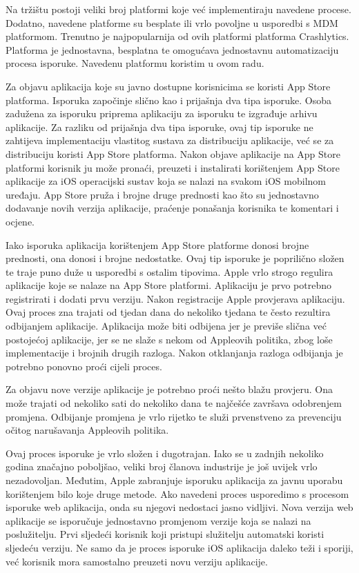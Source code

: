 \documentclass[times, utf8, diplomski, numeric]{fer}
\begin{document}
Na tržištu postoji veliki broj platformi koje već implementiraju navedene procese. Dodatno, navedene platforme su besplate ili vrlo povoljne u usporedbi s MDM platformom. Trenutno je najpopularnija od ovih platformi platforma Crashlytics. Platforma je jednostavna, besplatna te omogućava jednostavnu automatizaciju procesa isporuke. Navedenu platformu koristim u ovom radu.

Za objavu aplikacija koje su javno dostupne korisnicima se koristi App Store platforma. Isporuka započinje slično kao i prijašnja dva tipa isporuke. Osoba zadužena za isporuku priprema aplikaciju za isporuku te izgrađuje arhivu aplikacije. Za razliku od prijašnja dva tipa isporuke, ovaj tip isporuke ne zahtijeva implementaciju vlastitog sustava za distribuciju aplikacije, već se za distribuciju koristi App Store platforma. Nakon objave aplikacije na App Store platformi korisnik ju može pronaći, preuzeti i instalirati korištenjem App Store aplikacije za iOS operacijski sustav koja se nalazi na svakom iOS mobilnom uređaju. App Store pruža i brojne druge prednosti kao što su jednostavno dodavanje novih verzija aplikacije, praćenje ponašanja korisnika te komentari i ocjene.

Iako isporuka aplikacija korištenjem App Store platforme donosi brojne prednosti, ona donosi i brojne nedostatke. Ovaj tip isporuke je poprilično složen te traje puno duže u usporedbi s ostalim tipovima. Apple vrlo strogo regulira aplikacije koje se nalaze na App Store platformi. Aplikaciju je prvo potrebno registrirati i dodati prvu verziju. Nakon registracije Apple provjerava aplikaciju. Ovaj proces zna trajati od tjedan dana do nekoliko tjedana te često rezultira odbijanjem aplikacije. Aplikacija može biti odbijena jer je previše slična već postojećoj aplikacije, jer se ne slaže s nekom od Appleovih politika, zbog loše implementacije i brojnih drugih razloga. Nakon otklanjanja razloga odbijanja je potrebno ponovno proći cijeli proces.

Za objavu nove verzije aplikacije je potrebno proći nešto blažu provjeru. Ona može trajati od nekoliko sati do nekoliko dana te najčešće završava odobrenjem promjena. Odbijanje promjena je vrlo rijetko te služi prvenstveno za prevenciju očitog narušavanja Appleovih politika.

Ovaj proces isporuke je vrlo složen i dugotrajan. Iako se u zadnjih nekoliko godina značajno poboljšao, veliki broj članova industrije je još uvijek vrlo nezadovoljan. Međutim, Apple zabranjuje isporuku aplikacija za javnu uporabu korištenjem bilo koje druge metode. Ako navedeni proces usporedimo s procesom isporuke web aplikacija, onda su njegovi nedostaci jasno vidljivi. Nova verzija web aplikacije se isporučuje jednostavno promjenom verzije koja se nalazi na poslužitelju. Prvi sljedeći korisnik koji pristupi služitelju automatski koristi sljedeću verziju. Ne samo da je proces isporuke iOS aplikacija daleko teži i sporiji, već korisnik mora samostalno preuzeti novu verziju aplikacije.
\end{document}
